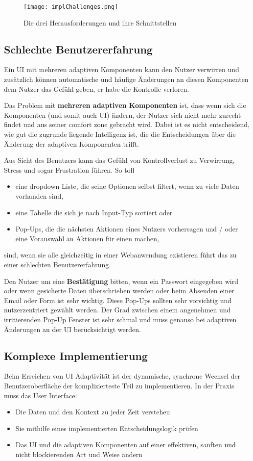 \begin{figure}[h]
    \centering
    \texttt{[image: implChallenges.png]}
    \caption{Die drei Herausforderungen und ihre Schnittstellen}
\end{figure}

\subsection{Schlechte Benutzererfahrung}
Ein UI mit mehreren adaptiven Komponenten kann den Nutzer verwirren und zusätzlich können automatische
und häufige Änderungen an diesen Komponenten dem Nutzer das Gefühl geben, er habe die Kontrolle verloren.

Das Problem mit \textbf{mehreren adaptiven Komponenten} ist, dass wenn sich die Komponenten
(und somit auch UI) ändern, der Nutzer sich nicht mehr zurecht findet und aus seiner comfort
zone gebracht wird. Dabei ist es nicht entscheidend, wie gut die zugrunde liegende Intelligenz ist,
die die Entscheidungen über die Änderung der adaptiven Komponenten trifft.

Aus Sicht des Benutzers kann das Gefühl von Kontrollverlust zu Verwirrung, Stress und sogar Frustration führen. So toll
\begin{itemize}
    \item eine dropdown Liste, die seine Optionen selbst filtert, wenn zu viele Daten vorhanden sind,
    \item eine Tabelle die sich je nach Input-Typ sortiert oder
    \item Pop-Ups, die die nächsten Aktionen eines Nutzers vorhersagen und / oder eine Vorauswahl an Aktionen für einen machen,
\end{itemize}
sind, wenn sie alle gleichzeitig in einer Webanwendung existieren führt das zu einer schlechten Benutzererfahrung.

Den Nutzer um eine \textbf{Bestätigung} bitten, wenn ein Passwort eingegeben wird oder wenn gesicherte Daten
überschrieben werden oder beim Absenden einer Email oder Form ist sehr wichtig.
Diese Pop-Ups sollten sehr vorsichtig und nutzerzentriert gewählt werden. Der Grad zwischen einem
angenehmen und irritierenden Pop-Up Fenster ist sehr schmal und muss genauso bei adaptiven Änderungen
an der UI berücksichtigt werden.

\subsection{Komplexe Implementierung}
Beim Erreichen von UI Adaptivität ist der dynamische, synchrone Wechsel der Benutzeroberfläche der komplizierteste Teil zu implementieren.
In der Praxis muss das User Interface:
\begin{itemize}
    \item Die Daten und den Kontext zu jeder Zeit verstehen
    \item Sie mithilfe eines implementierten Entscheidungslogik prüfen
    \item Das UI und die adaptiven Komponenten auf einer effektiven, sanften und nicht blockierenden Art und Weise ändern
\end{itemize}


